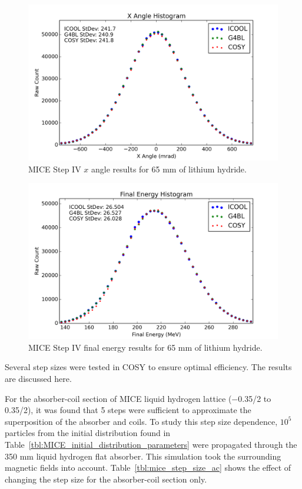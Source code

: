 \begin{figure}[H]
  \centering
    \includegraphics[width=\textwidth]{MICE data/LiH/px} 
  \caption{MICE Step IV $x$ angle results for 65 mm of lithium hydride.}
  \label{fig:mice_lih_xangle}
\end{figure}

\begin{figure}[H]
  \centering
    \includegraphics[width=\textwidth]{MICE data/LiH/e} 
  \caption{MICE Step IV final energy results for 65 mm of lithium hydride.}
  \label{fig:mice_lih_energy}
\end{figure}

\label{ssc:step_size_effects}
Several step sizes were tested in COSY to ensure optimal efficiency. The results are discussed here.

For the absorber-coil section of MICE liquid hydrogen lattice ($-$0.35/2 to 0.35/2), it was found that 5 steps were sufficient to approximate the superposition of the absorber and coils. To study this step size dependence, $10^5$ particles from the initial distribution found in Table~\ref{tbl:MICE_initial_distribution_parameters} were propagated through the 350 mm liquid hydrogen flat absorber. This simulation took the surrounding magnetic fields into account. Table~\ref{tbl:mice_step_size_ac} shows the effect of changing the step size for the absorber-coil section only.

